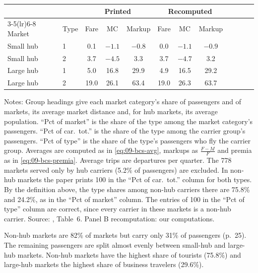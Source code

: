 \begin{table}[htbp]
\begin{threeparttable}
\begin{tabular}{@{}llcccccccccc@{}}
\midrule
 & & \multicolumn{3}{c}{Printed} & \multicolumn{3}{c}{Recomputed} & & & & \\
\cmidrule(lr){3-5}\cmidrule(lr){6-8}
Market & Type & Fare & MC & Markup & Fare & MC & Markup & & & & \\
\midrule
Small hub & 1 & 0.1 & $-1.1$ & $-0.8$ & 0.0 & $-1.1$ & $-0.9$ & & & & \\
Small hub & 2 & 3.7 & $-4.5$ & 3.3 & 3.7 & $-4.7$ & 3.2 & & & & \\
Large hub & 1 & 5.0 & 16.8 & 29.9 & 4.9 & 16.5 & 29.2 & & & & \\
Large hub & 2 & 19.0 & 26.1 & 63.4 & 19.0 & 26.3 & 63.7 & & & & \\
\bottomrule
\end{tabular}
\begin{tablenotes}\footnotesize
\item Notes: Group headings give each market category's share of passengers and of markets, its average
market distance and, for hub markets, its average population. ``Pct of market'' is the share of the type
among the market category's passengers. ``Pct of
car.\ tot.'' is the share of the type among the carrier group's passengers. ``Pct of type'' is the share of
the type's passengers who fly the carrier group. Averages are computed as in \eqref{eq:09-bcs-avg}, markups
as $\frac{F-M}{F}$ and premia as in \eqref{eq:09-bcs-premia}. Average trips are departures per quarter. The
778 markets served only by hub carriers (5.2\% of passengers) are excluded. In non-hub markets the paper
prints 100 in the ``Pct of car.\ tot.'' column for both types. By the definition above, the type shares among
non-hub carriers there are 75.8\% and 24.2\%, as in the ``Pct of market'' column. The entries of 100 in the
``Pct of type'' column are correct, since every carrier in these markets is a non-hub carrier. Source:
\citet{BerryCarnallSpiller1996}, Table~6. Panel B recomputation: our computations.
\end{tablenotes}
\end{threeparttable}
\end{table}

Non-hub markets are 82\% of markets but carry only 31\% of passengers (p.~25). The remaining passengers are
split almost evenly between small-hub and large-hub markets. Non-hub markets have the highest share of
tourists (75.8\%) and large-hub markets the highest share of business travelers (29.6\%).

